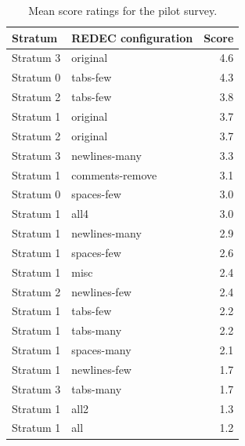 \documentclass[%
class=scrreprt,
chapterprefix=false,%
open=right,%
twoside=true,%
paper=a4,%
logofile={Logo\_zentral\_farbig\_EN.png},%
thesistype=master,%
UKenglish,%
]{se2thesis}
\theoremstyle{definition}
\newcommand{\rdh}{REDEC\xspace}
\begin{document}
	
	\begin{table}[tb]
		\centering
		\caption{Mean score ratings for the pilot survey. 
		}
		\label{tab:pilot_survey_results}
		\begin{tabular}{llr}
			\toprule
			Stratum & \rdh configuration & Score \\
			\midrule
			Stratum 3 & original & 4.6 \\
			Stratum 0 & tabs-few & 4.3 \\
			Stratum 2 & tabs-few & 3.8 \\
			Stratum 1 & original & 3.7 \\
			Stratum 2 & original & 3.7 \\
			Stratum 3 & newlines-many & 3.3 \\
			Stratum 1 & comments-remove & 3.1 \\
			Stratum 0 & spaces-few & 3.0 \\
			Stratum 1 & all4 & 3.0 \\
			Stratum 1 & newlines-many & 2.9 \\
			Stratum 1 & spaces-few & 2.6 \\
			Stratum 1 & misc & 2.4 \\
			Stratum 2 & newlines-few & 2.4 \\
			Stratum 1 & tabs-few & 2.2 \\
			Stratum 1 & tabs-many & 2.2 \\
			Stratum 1 & spaces-many & 2.1 \\
			Stratum 1 & newlines-few & 1.7 \\
			Stratum 3 & tabs-many & 1.7 \\
			Stratum 1 & all2 & 1.3 \\
			Stratum 1 & all & 1.2 \\
			\bottomrule
		\end{tabular}
	\end{table}
	
\end{document}
